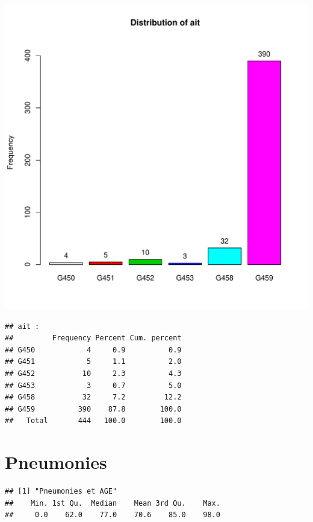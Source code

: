 \documentclass[12pt,english,french,twoside]{report}\usepackage[]{graphicx}\usepackage[]{color}
\makeatletter
\def\maxwidth{ %
  \ifdim\Gin@nat@width>\linewidth
    \linewidth
  \else
    \Gin@nat@width
  \fi
}
\newenvironment{kframe}{%
 \def\at@end@of@kframe{}%
 \ifinner\ifhmode%
  \def\at@end@of@kframe{\end{minipage}}%
  \begin{minipage}{\columnwidth}%
 \fi\fi%
 \def\FrameCommand##1{\hskip\@totalleftmargin \hskip-\fboxsep
 \colorbox{shadecolor}{##1}\hskip-\fboxsep
     \hskip-\linewidth \hskip-\@totalleftmargin \hskip\columnwidth}%
 \MakeFramed {\advance\hsize-\width
   \@totalleftmargin\z@ \linewidth\hsize
   \@setminipage}}%
 {\par\unskip\endMakeFramed%
 \at@end@of@kframe}
\newenvironment{knitrout}{}{} %
\makeatother
\begin{document}
\begin{knitrout}
\color{fgcolor}
\includegraphics[width=\maxwidth]{figure/ait} 
\begin{kframe}\begin{verbatim}
## ait :  
##         Frequency Percent Cum. percent
## G450            4     0.9          0.9
## G451            5     1.1          2.0
## G452           10     2.3          4.3
## G453            3     0.7          5.0
## G458           32     7.2         12.2
## G459          390    87.8        100.0
##   Total       444   100.0        100.0
\end{verbatim}
\end{kframe}
\end{knitrout}


\section*{Pneumonies}

\begin{knitrout}
\color{fgcolor}\begin{kframe}
\begin{verbatim}
## [1] "Pneumonies et AGE"
##    Min. 1st Qu.  Median    Mean 3rd Qu.    Max. 
##     0.0    62.0    77.0    70.6    85.0    98.0
\end{verbatim}
\end{kframe}
\end{knitrout}
\end{document}
